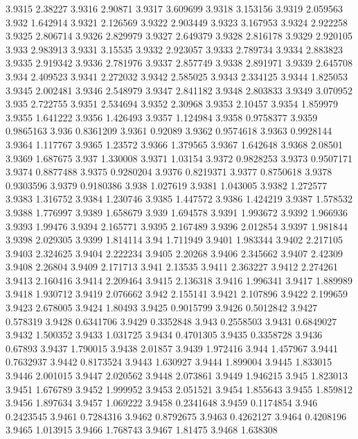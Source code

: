 3.9315  2.38227
3.9316  2.90871
3.9317  3.609699
3.9318  3.153156
3.9319  2.059563
3.932  1.642914
3.9321  2.126569
3.9322  2.903449
3.9323  3.167953
3.9324  2.922258
3.9325  2.806714
3.9326  2.829979
3.9327  2.649379
3.9328  2.816178
3.9329  2.920105
3.933  2.983913
3.9331  3.15535
3.9332  2.923057
3.9333  2.789734
3.9334  2.883823
3.9335  2.919342
3.9336  2.781976
3.9337  2.857749
3.9338  2.891971
3.9339  2.645708
3.934  2.409523
3.9341  2.272032
3.9342  2.585025
3.9343  2.334125
3.9344  1.825053
3.9345  2.002481
3.9346  2.548979
3.9347  2.841182
3.9348  2.803833
3.9349  3.070952
3.935  2.722755
3.9351  2.534694
3.9352  2.30968
3.9353  2.10457
3.9354  1.859979
3.9355  1.641222
3.9356  1.426493
3.9357  1.124984
3.9358  0.9758377
3.9359  0.9865163
3.936  0.8361209
3.9361  0.92089
3.9362  0.9574618
3.9363  0.9928144
3.9364  1.117767
3.9365  1.23572
3.9366  1.379565
3.9367  1.642648
3.9368  2.08501
3.9369  1.687675
3.937  1.330008
3.9371  1.03154
3.9372  0.9828253
3.9373  0.9507171
3.9374  0.8877488
3.9375  0.9280204
3.9376  0.8219371
3.9377  0.8750618
3.9378  0.9303596
3.9379  0.9180386
3.938  1.027619
3.9381  1.043005
3.9382  1.272577
3.9383  1.316752
3.9384  1.230746
3.9385  1.447572
3.9386  1.424219
3.9387  1.578532
3.9388  1.776997
3.9389  1.658679
3.939  1.694578
3.9391  1.993672
3.9392  1.966936
3.9393  1.99476
3.9394  2.165771
3.9395  2.167489
3.9396  2.012854
3.9397  1.981844
3.9398  2.029305
3.9399  1.814114
3.94  1.711949
3.9401  1.983344
3.9402  2.217105
3.9403  2.324625
3.9404  2.222234
3.9405  2.20268
3.9406  2.345662
3.9407  2.42309
3.9408  2.26804
3.9409  2.171713
3.941  2.13535
3.9411  2.363227
3.9412  2.274261
3.9413  2.160416
3.9414  2.209464
3.9415  2.136318
3.9416  1.996341
3.9417  1.889989
3.9418  1.930712
3.9419  2.076662
3.942  2.155141
3.9421  2.107896
3.9422  2.199659
3.9423  2.678005
3.9424  1.80493
3.9425  0.9015799
3.9426  0.5012842
3.9427  0.578319
3.9428  0.6341706
3.9429  0.3352848
3.943  0.2558503
3.9431  0.6849027
3.9432  1.500352
3.9433  1.031725
3.9434  0.4701305
3.9435  0.3358728
3.9436  0.67893
3.9437  1.790015
3.9438  2.01857
3.9439  1.972416
3.944  1.457967
3.9441  0.7632937
3.9442  0.8173524
3.9443  1.630927
3.9444  1.899004
3.9445  1.833015
3.9446  2.001015
3.9447  2.020562
3.9448  2.073861
3.9449  1.946215
3.945  1.823013
3.9451  1.676789
3.9452  1.999952
3.9453  2.051521
3.9454  1.855643
3.9455  1.859812
3.9456  1.897634
3.9457  1.069222
3.9458  0.2341648
3.9459  0.1174854
3.946  0.2423545
3.9461  0.7284316
3.9462  0.8792675
3.9463  0.4262127
3.9464  0.4208196
3.9465  1.013915
3.9466  1.768743
3.9467  1.81475
3.9468  1.638308
